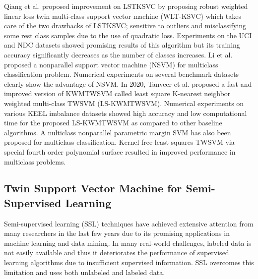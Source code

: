 \documentclass[pdflatex,sn-mathphys]{sn-jnl}%
\theoremstyle{thmstyleone}%
\theoremstyle{thmstyletwo}%
\theoremstyle{thmstylethree}%
\begin{document}
Qiang et al. \cite{qiang2020robust}  proposed improvement on LSTKSVC by proposing robust weighted linear loss twin multi-class support vector machine (WLT-KSVC) which takes care of the two drawbacks of LSTKSVC;  sensitive to outliers and misclassifying some rest class samples due to the use of quadratic loss. Experiments on the UCI and NDC datasets showed promising results of this algorithm but its training accuracy significantly decreases as the number of classes increases. Li et al. \cite{li2019single} proposed a nonparallel support vector machine (NSVM) for multiclass classification problem. Numerical experiments on several benchmark datasets clearly show the advantage of NSVM. In 2020, Tanveer et al. \cite{tanveer2020least} proposed a fast and improved version of KWMTWSVM \cite{xu2014k} called least square K-nearest neighbor weighted multi-class TWSVM (LS-KWMTWSVM). Numerical experiments on various KEEL imbalance datasets showed high accuracy and low computational time for the proposed LS-KWMTWSVM as compared to other baseline algorithms. A nulticlass nonparallel parametric margin SVM \cite{du2021multiclass} has also been proposed for multiclass classification. Kernel free least squares TWSVM \cite{gao2021novel} via special fourth order polynomial surface  resulted in improved performance in multiclass problems.


\subsection{Twin Support Vector Machine for Semi-Supervised Learning}

Semi-supervised learning (SSL) techniques have achieved extensive attention from many researchers in the last few years due to its promising applications in machine learning and data mining. In many real-world challenges, labeled data is not easily available and thus it deteriorates the performance of supervised learning algorithms due to insufficient supervised information. SSL overcomes this limitation and uses both unlabeled and labeled data.
\end{document}
